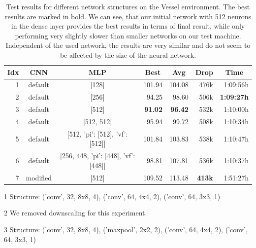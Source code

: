 \begin{table}[htp]
    \begin{center}
        \begin{threeparttable}
            \begin{tabular}{rccrrrr}
                \toprule
                \multicolumn{1}{c}{Idx} & \multicolumn{1}{c}{CNN} & \multicolumn{1}{c}{MLP} & \multicolumn{1}{c}{Best} & \multicolumn{1}{c}{Avg} & \multicolumn{1}{c}{Drop} & \multicolumn{1}{c}{Time}\\
                \midrule
                1 & default\tnote{1} & [128] & 101.94 & 104.08 & 476k & 1:09:56h \\
                2 & default\tnote{1} & [256] & 94.25 & 98.60 & 506k & \textbf{1:09:27h} \\
                3 & default\tnote{1} & [512] & \textbf{91.02} & \textbf{96.42} & 532k & 1:10:00h \\
                4 & default\tnote{1} & [512, 512] & 95.94 & 99.72 & 508k & 1:10:34h \\
                5 & default\tnote{1} & [512, {'pi': [512], 'vf': [512]}] & 101.84 & 103.83 & 538k & 1:10:47h \\
                6 & default\tnote{1} & [256, 448, {'pi': [448], 'vf': [448]}] & 98.81 & 107.81 & 536k & 1:10:37h \\
                7\tnote{2} & modified\tnote{3} & [512] & 109.52 & 113.48 & \textbf{413k} & 1:51:27h \\
                \bottomrule
            \end{tabular}
            \begin{tablenotes} \footnotesize
                \item[1] Structure: ('conv', 32, 8x8, 4), ('conv', 64, 4x4, 2), ('conv', 64, 3x3, 1)
                \item[2] We removed downscaling for this experiment.
                \item[3] Structure: ('conv', 32, 8x8, 4), ('maxpool', 2x2, 2), ('conv', 64, 4x4, 2), ('conv', 64, 3x3, 1)
            \end{tablenotes}

        \end{threeparttable}
        
    \end{center}
    \caption[Test Results for Different Network Structures on the Vessel Environment]{Test results for different network structures on the Vessel environment. The best results are marked in bold. We can see, that our initial network with 512 neurons in the dense layer provides the best results in terms of final result, while only performing very slightly slower than smaller networks on our test machine. Independent of the used network, the results are very similar and do not seem to be affected by the size of the neural network.} \label{tab:Eval/NetworkStructure/Vessel}
\end{table}

